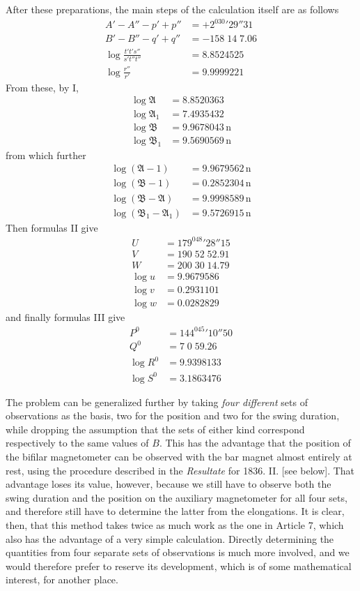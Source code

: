 After these preparations, the main steps of the calculation itself are as follows
\[
\begin{aligned}
A'-A''-p'+p''&=+2^030'29''31\\
B'-B''-q'+q''&=-158\;14\;7.06\\
\log\frac{t't's''}{s't''t''}&=8.8524525\\
\log\frac{r''}{r'}&=9.9999221
\end{aligned}
\]
From these, by I,
\[
\begin{aligned}
\log\mathfrak{A}&=8.8520363\\
\log\mathfrak{A}_1&=7.4935432\\
\log\mathfrak{B}&=9.9678043\,\mathrm{n}\\
\log\mathfrak{B}_1&=9.5690569\,\mathrm{n}
\end{aligned}
\]
from which further
\[
\begin{aligned}
\log(\mathfrak{A}-1)&=9.9679562\,\mathrm{n}\\
\log(\mathfrak{B}-1)&=0.2852304\,\mathrm{n}\\
\log(\mathfrak{B}-\mathfrak{A})&=9.9998589\,\mathrm{n}\\
\log(\mathfrak{B}_1-\mathfrak{A}_1)&=9.5726915\,\mathrm{n}
\end{aligned}
\]
Then formulas II give
\[
\begin{aligned}
U&=179^048'28''15\\
V&=190\;52\;52.91\\
W&=200\;30\;14.79\\
\log u&=9.9679586\\
\log v&=0.2931101\\
\log w&=0.0282829
\end{aligned}
\]
and finally formulas III give
\[
\begin{aligned}
P^0&=144^045'10''50\\
Q^0&=7\;0\;59.26\\
\log R^0&=9.9398133\\
\log S^0&=3.1863476
\end{aligned}
\]

The problem can be generalized further by taking \textit{four different} sets of observations as the basis, two for the position and two for the swing duration, while dropping the assumption that the sets of either kind correspond respectively to the same values of $B$. This has the advantage that the position of the bifilar magnetometer can be observed with the bar magnet almost entirely at rest, using the procedure described in the \textit{Resultate} for 1836. II. [see below]. That advantage loses its value, however, because we still have to observe both the swing duration and the position on the auxiliary magnetometer for all four sets, and therefore still have to determine the latter from the elongations. It is clear, then, that this method takes twice as much work as the one in Article 7, which also has the advantage of a very simple calculation. Directly determining the quantities from four separate sets of observations is much more involved, and we would therefore prefer to reserve its development, which is of some mathematical interest, for another place.

